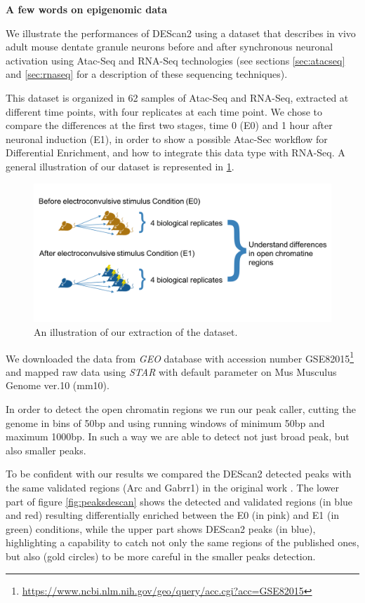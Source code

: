 \textbf{A few words on epigenomic data}

We illustrate the performances of DEScan2 using a dataset \cite{Su2017} that describes in vivo adult mouse dentate granule neurons before and after synchronous neuronal activation using Atac-Seq and RNA-Seq technologies (see sections \ref{sec:atacseq} and \ref{sec:rnaseq} for a description of these sequencing techniques).

This dataset is organized in 62 samples of Atac-Seq and RNA-Seq, extracted at different time points, with four replicates at each time point.
We chose to compare the differences at the first two stages, time 0 (E0) and 1 hour after neuronal induction (E1), in order to show a possible Atac-Sec workflow for Differential Enrichment, and how to integrate this data type with RNA-Seq. A general illustration of our dataset is represented in \ref{fig:atacdataset}.

\begin{figure}[H]
\includegraphics[width=\textwidth,height=\textheight,keepaspectratio]{img/descan2/dataset.png}
\caption[DEScan2 dataset illustration]{An illustration of our extraction of the \cite{Su2017} dataset.}
\label{fig:atacdataset}
\centering
\end{figure}

We downloaded the data from \textit{GEO} database \cite{Edgar2002, Barrett2013} with accession number GSE82015\footnote{\url{https://www.ncbi.nlm.nih.gov/geo/query/acc.cgi?acc=GSE82015}} and mapped raw data using \textit{STAR} \cite{Dobin2013} with default parameter on Mus Musculus Genome ver.10 (mm10).

In order to detect the open chromatin regions we run our peak caller, cutting the genome in bins of 50bp and using running windows of minimum 50bp and maximum 1000bp. In such a way we are able to detect not just broad peak, but also smaller peaks.

To be confident with our results we compared the DEScan2 detected peaks with the same validated regions (Arc and Gabrr1) in the original work \cite{Su2017}.
The lower part of figure \ref{fig:peaksdescan} shows the detected and validated regions (in blue and red) resulting differentially enriched between the E0 (in pink) and E1 (in green) conditions, while the upper part shows DEScan2 peaks (in blue), highlighting a capability to catch not only the same regions of the published ones, but also (gold circles) to be more careful in the smaller peaks detection.


